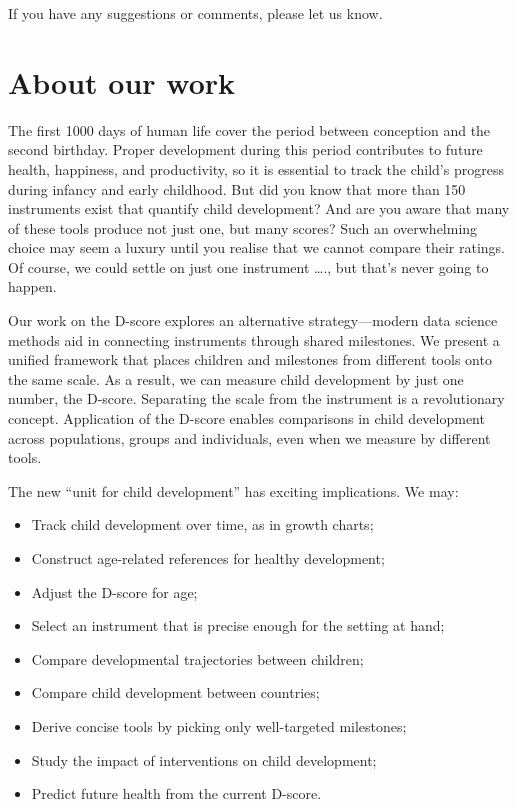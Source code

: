 \documentclass[
]{book}
\providecommand{\tightlist}{%
  \setlength{\itemsep}{0pt}\setlength{\parskip}{0pt}}
\begin{document}
If you have any suggestions or comments, please let us know.

\hypertarget{about-our-work}{%
\section*{About our work}\label{about-our-work}}

The first 1000 days of human life cover the period between conception and the second birthday. Proper development during this period contributes to future health, happiness, and productivity, so it is essential to track the child's progress during infancy and early childhood.
But did you know that more than 150 instruments exist that quantify child development? And are you aware that many of these tools produce not just one, but many scores? Such an overwhelming choice may seem a luxury until you realise that we cannot compare their ratings. Of course, we could settle on just one instrument \ldots., but that's never going to happen.

Our work on the D-score explores an alternative strategy---modern data science methods aid in connecting instruments through shared milestones. We present a unified framework that places children and milestones from different tools onto the same scale. As a result, we can measure child development by just one number, the D-score. Separating the scale from the instrument is a revolutionary concept. Application of the D-score enables comparisons in child development across populations, groups and individuals, even when we measure by different tools.

The new ``unit for child development'' has exciting implications. We may:

\begin{itemize}
\tightlist
\item
  Track child development over time, as in growth charts;
\item
  Construct age-related references for healthy development;
\item
  Adjust the D-score for age;
\item
  Select an instrument that is precise enough for the setting at hand;
\item
  Compare developmental trajectories between children;
\item
  Compare child development between countries;
\item
  Derive concise tools by picking only well-targeted milestones;
\item
  Study the impact of interventions on child development;
\item
  Predict future health from the current D-score.
\end{itemize}
\end{document}

